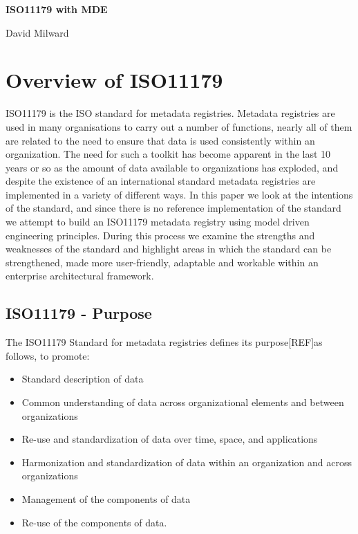 \documentclass{article}
\begin{document}
 

\bgroup \parindent 0pt
{\Large\textbf{ISO11179 with MDE}}

\vskip 4mm 

{\Large {David Milward}}

\egroup

\vskip 14mm

\noindent

\section{Overview of ISO11179}

ISO11179 is the ISO standard for metadata registries. Metadata registries are used in many organisations to carry out a number of functions, nearly all of them are related to the need to ensure that data is used consistently within an organization.  The need for such a toolkit has become apparent in the last 10 years or so as the amount of data available to organizations has exploded, and despite the existence of an international standard metadata registries are implemented in a variety of different ways. In this paper we look at the intentions of the standard, and since there is no reference implementation of the standard we attempt to build an ISO11179 metadata registry using model driven engineering principles. During this process we examine the strengths and weaknesses of the standard and highlight areas in which the standard can be strengthened, made more user-friendly, adaptable and workable within an enterprise architectural framework. 


\subsection{ISO11179 - Purpose}

The ISO11179 Standard for metadata registries defines its purpose[REF]as follows,
\newline
to promote:
\begin{itemize}
\item Standard description of data
\item Common understanding of data across organizational elements and between organizations
\item Re-use and standardization of data over time, space, and applications
\item Harmonization and standardization of data within an organization and across organizations
\item Management of the components of data
\item Re-use of the components of data.
\end{itemize}
\end{document}
